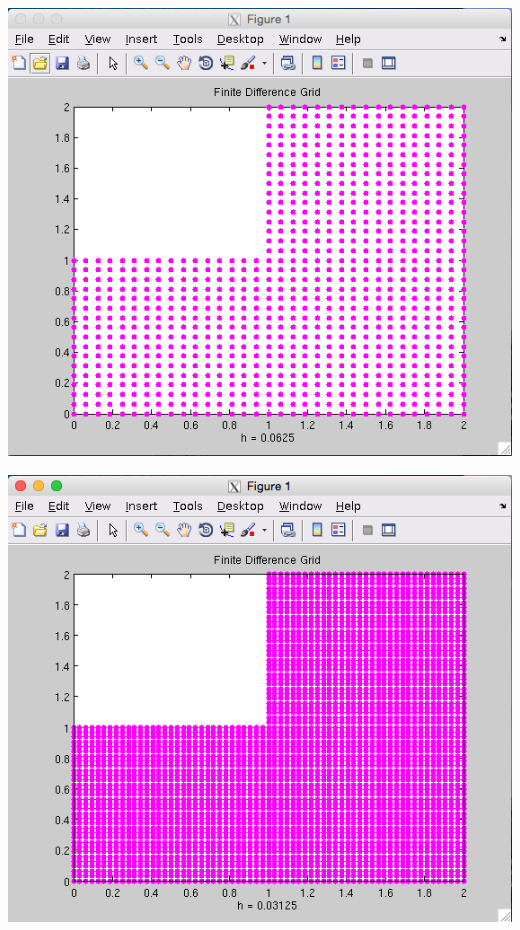 \documentclass[11pt, oneside]{article}   	%
\begin{document}
\centerline{\includegraphics[scale = 0.55]{Grid_h4.png}}

\centerline{\includegraphics[scale = 0.55]{Grid_h5.png}}
\end{document}
